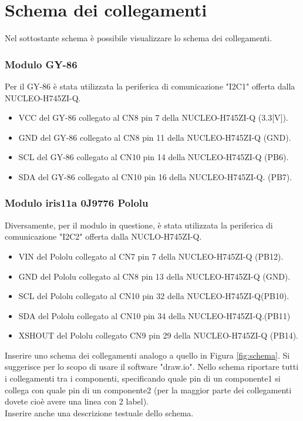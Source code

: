 \documentclass[11pt]{report}
\begin{document}
\section{Schema dei collegamenti}
Nel sottostante schema è possibile visualizzare lo schema dei collegamenti.\\
\subsubsection{Modulo GY-86}
Per il GY-86 è stata utilizzata la periferica di comunicazione "I2C1" offerta dalla NUCLEO-H745ZI-Q.
\begin{itemize}
\item VCC del GY-86 collegato al CN8 pin 7   della NUCLEO-H745ZI-Q (3.3[V]).
\item GND del GY-86 collegato al CN8 pin 11  della NUCLEO-H745ZI-Q (GND).
\item SCL del GY-86 collegato al CN10 pin 14 della NUCLEO-H745ZI-Q (PB6).
\item SDA del GY-86 collegato al CN10 pin 16 della NUCLEO-H745ZI-Q. (PB7).
\end{itemize}
\subsubsection{Modulo iris11a 0J9776 Pololu}
Diversamente, per il modulo in questione, è stata utilizzata la periferica di comunicazione "I2C2" offerta dalla NUCLO-H745ZI-Q.
\begin{itemize}
\item VIN del Pololu collegato al CN7 pin 7   della NUCLEO-H745ZI-Q (PB12).
\item GND del Pololu collegato al CN8 pin 13  della NUCLEO-H745ZI-Q (GND).
\item SCL del Pololu collegato al CN10 pin 32 della NUCLEO-H745ZI-Q(PB10).
\item SDA del Pololu collegato al CN10 pin 34 della NUCLEO-H745ZI-Q.(PB11)
\item XSHOUT del Pololu collegato CN9 pin 29 della NUCLEO-H745ZI-Q (PB14).
\end{itemize}
Inserire uno schema dei collegamenti analogo a quello in Figura \ref{fig:schema}. Si suggerisce per lo scopo di usare il software "draw.io". Nello schema riportare tutti i collegamenti tra i componenti, specificando quale pin di un componente1 si collega con quale pin di un componente2 (per la maggior parte dei collegamenti dovete cioè avere una linea con 2 label). \\
Inserire anche una descrizione testuale dello schema.
\end{document}
